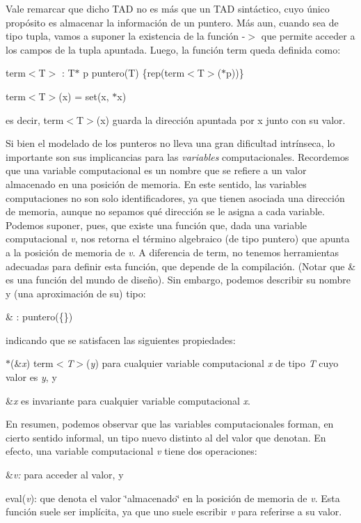 \-Vale remarcar que dicho \-T\-A\-D no es más que un \-T\-A\-D sintáctico, cuyo único propósito es almacenar la información de un puntero. \-Más aun, cuando  sea de tipo tupla, vamos a suponer la existencia de la función -\/$>$ que permite acceder a los campos de la tupla apuntada. \-Luego, la función term queda definida como\-:
\begin{DoxyItemize}
\item term$<$\-T$>$ \-: \-T$\ast$ p  puntero(\-T) \{rep(term$<$\-T$>$($\ast$p))\}
\item term$<$\-T$>$(x) = set(x, $\ast$x)
\end{DoxyItemize}

es decir, term$<$\-T$>$(x) guarda la dirección apuntada por x junto con su valor.

\-Si bien el modelado de los punteros no lleva una gran dificultad intrínseca, lo importante son sus implicancias para las {\itshape variables\/} computacionales. \-Recordemos que una variable computacional es un nombre que se refiere a un valor almacenado en una posición de memoria. \-En este sentido, las variables computaciones no son solo identificadores, ya que tienen asociada una dirección de memoria, aunque no sepamos qué dirección se le asigna a cada variable. \-Podemos suponer, pues, que existe una función que, dada una variable computacional {\itshape v\/}, nos retorna el término algebraico (de tipo puntero) que apunta a la posición de memoria de {\itshape v\/}. \-A diferencia de term, no tenemos herramientas adecuadas para definir esta función, que depende de la compilación. (\-Notar que \& es una función del mundo de diseño). \-Sin embargo, podemos describir su nombre y (una aproximación de su) tipo\-:
\begin{DoxyItemize}
\item \& \-:   puntero(\{\})
\end{DoxyItemize}

indicando que se satisfacen las siguientes propiedades\-:
\begin{DoxyEnumerate}
\item $\ast$(\&{\itshape x\/})  term$<${\itshape \-T$>$\/}({\itshape y\/}) para cualquier variable computacional {\itshape x\/} de tipo {\itshape \-T\/} cuyo valor es {\itshape y\/}, y
\item \&{\itshape x\/} es invariante para cualquier variable computacional {\itshape x\/}.
\end{DoxyEnumerate}

\-En resumen, podemos observar que las variables computacionales forman, en cierto sentido informal, un tipo nuevo distinto al del valor que denotan. \-En efecto, una variable computacional {\itshape v\/} tiene dos operaciones\-:
\begin{DoxyEnumerate}
\item \&{\itshape v\-:\/} para acceder al valor, y
\item eval({\itshape v\/})\-: que denota el valor \char`\"{}almacenado\char`\"{} en la posición de memoria de {\itshape v\/}. \-Esta función suele ser implícita, ya que uno suele escribir {\itshape v\/} para referirse a su valor.
\end{DoxyEnumerate}

